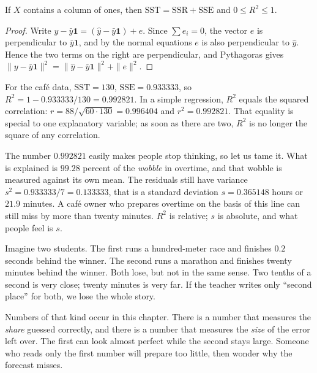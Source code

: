 \begin{teorema}
If $X$ contains a column of ones, then $\mathrm{SST}=\mathrm{SSR}+\mathrm{SSE}$ and
$0\le R^2\le1$.
\end{teorema}

\begin{proof}[Proof]
Write $y-\bar y\mathbf{1}=(\hat y-\bar y\mathbf{1})+e$. Since $\sum e_i=0$, the vector $e$ is
perpendicular to $\bar y\mathbf{1}$, and by the normal equations $e$ is also perpendicular to
$\hat y$. Hence the two terms on the right are perpendicular, and Pythagoras gives
$\|y-\bar y\mathbf{1}\|^2=\|\hat y-\bar y\mathbf{1}\|^2+\|e\|^2$.
\end{proof}

For the café data, $\mathrm{SST}=130$, $\mathrm{SSE}=0.933333$, so
$R^2=1-0.933333/130=0.992821$. In a simple regression, $R^2$ equals the squared correlation:
$r=88/\sqrt{60\cdot130}=0.996404$ and $r^2=0.992821$. That equality is special to one
explanatory variable; as soon as there are two, $R^2$ is no longer the square of any
correlation.

The number $0.992821$ easily makes people stop thinking, so let us tame it. What is explained is
$99.28$ percent of the \emph{wobble} in overtime, and that wobble is measured against its own
mean. The residuals still have variance $s^2=0.933333/7=0.133333$, that is a standard deviation
$s=0.365148$ hours or $21.9$ minutes. A café owner who prepares overtime on the basis of this
line can still miss by more than twenty minutes. $R^2$ is relative; $s$ is absolute, and what
people feel is $s$.

\begin{untukanak}
Imagine two students. The first runs a hundred-meter race and finishes $0.2$ seconds behind the
winner. The second runs a marathon and finishes twenty minutes behind the winner. Both lose, but
not in the same sense. Two tenths of a second is very close; twenty minutes is very far. If the
teacher writes only ``second place'' for both, we lose the whole story.

Numbers of that kind occur in this chapter. There is a number that measures the \emph{share}
guessed correctly, and there is a number that measures the \emph{size} of the error left over.
The first can look almost perfect while the second stays large. Someone who reads only the first
number will prepare too little, then wonder why the forecast misses.
\end{untukanak}

